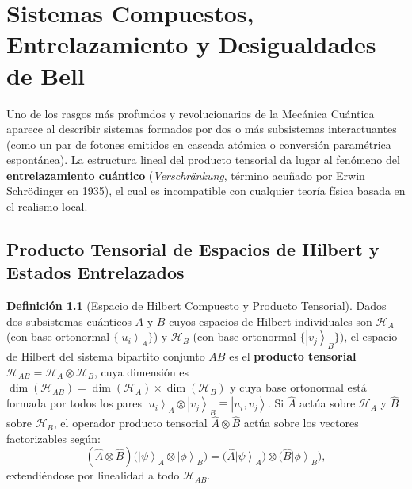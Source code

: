 \documentclass[11pt,a4paper,twoside]{report}
\theoremstyle{definition}
\newtheorem{definicion}{Definición}[chapter]
\theoremstyle{plain}
\theoremstyle{remark}
\newcommand{\ket}[1]{\left| #1 \right\rangle}
\newcommand{\Hil}{\mathcal{H}}
\newcommand{\op}[1]{\hat{#1}}
\begin{document}
\chapter{Sistemas Compuestos, Entrelazamiento y Desigualdades de Bell}

Uno de los rasgos más profundos y revolucionarios de la Mecánica Cuántica aparece al describir sistemas formados por dos o más subsistemas interactuantes (como un par de fotones emitidos en cascada atómica o conversión paramétrica espontánea). La estructura lineal del producto tensorial da lugar al fenómeno del \textbf{entrelazamiento cuántico} (\textit{Verschränkung}, término acuñado por Erwin Schrödinger en 1935), el cual es incompatible con cualquier teoría física basada en el realismo local.

\section{Producto Tensorial de Espacios de Hilbert y Estados Entrelazados}

\begin{definicion}[Espacio de Hilbert Compuesto y Producto Tensorial]
Dados dos subsistemas cuánticos $A$ y $B$ cuyos espacios de Hilbert individuales son $\Hil_A$ (con base ortonormal $\{\ket{u_i}_A\}$) y $\Hil_B$ (con base ortonormal $\{\ket{v_j}_B\}$), el espacio de Hilbert del sistema bipartito conjunto $AB$ es el \textbf{producto tensorial} $\Hil_{AB} = \Hil_A \otimes \Hil_B$, cuya dimensión es $\dim(\Hil_{AB}) = \dim(\Hil_A)\times \dim(\Hil_B)$ y cuya base ortonormal está formada por todos los pares $\ket{u_i}_A \otimes \ket{v_j}_B \equiv \ket{u_i, v_j}$. Si $\op{A}$ actúa sobre $\Hil_A$ y $\op{B}$ sobre $\Hil_B$, el operador producto tensorial $\op{A} \otimes \op{B}$ actúa sobre los vectores factorizables según:
\begin{equation}
    (\op{A} \otimes \op{B})\big(\ket{\psi}_A \otimes \ket{\phi}_B\big) = \big(\op{A}\ket{\psi}_A\big) \otimes \big(\op{B}\ket{\phi}_B\big),
\end{equation}
extendiéndose por linealidad a todo $\Hil_{AB}$.
\end{definicion}
\end{document}
